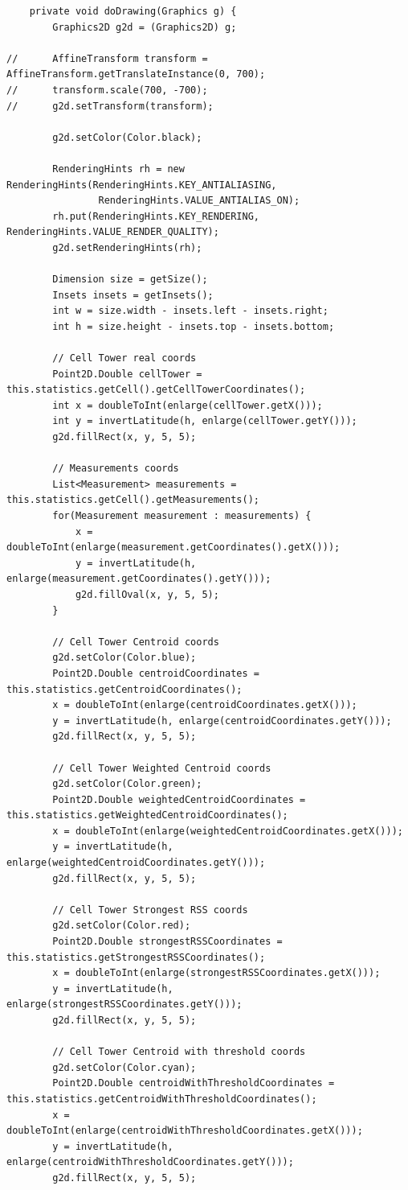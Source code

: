 \documentclass[a4paper, 12pt]{article}
\begin{document}
\begin{lstlisting}
	private void doDrawing(Graphics g) {
		Graphics2D g2d = (Graphics2D) g;
		
//		AffineTransform transform = AffineTransform.getTranslateInstance(0, 700);
//		transform.scale(700, -700);
//		g2d.setTransform(transform);
		
		g2d.setColor(Color.black);
		
		RenderingHints rh = new RenderingHints(RenderingHints.KEY_ANTIALIASING,
				RenderingHints.VALUE_ANTIALIAS_ON);
		rh.put(RenderingHints.KEY_RENDERING, RenderingHints.VALUE_RENDER_QUALITY);
		g2d.setRenderingHints(rh);
		
		Dimension size = getSize();
		Insets insets = getInsets();
		int w = size.width - insets.left - insets.right;
		int h = size.height - insets.top - insets.bottom;
		
		// Cell Tower real coords
		Point2D.Double cellTower = this.statistics.getCell().getCellTowerCoordinates();
		int x = doubleToInt(enlarge(cellTower.getX()));
		int y = invertLatitude(h, enlarge(cellTower.getY()));
		g2d.fillRect(x, y, 5, 5);
		
		// Measurements coords
		List<Measurement> measurements = this.statistics.getCell().getMeasurements();
		for(Measurement measurement : measurements) {
			x = doubleToInt(enlarge(measurement.getCoordinates().getX()));
			y = invertLatitude(h, enlarge(measurement.getCoordinates().getY()));
			g2d.fillOval(x, y, 5, 5);
		}
		
		// Cell Tower Centroid coords
		g2d.setColor(Color.blue);
		Point2D.Double centroidCoordinates = this.statistics.getCentroidCoordinates();
		x = doubleToInt(enlarge(centroidCoordinates.getX()));
		y = invertLatitude(h, enlarge(centroidCoordinates.getY()));
		g2d.fillRect(x, y, 5, 5);
		
		// Cell Tower Weighted Centroid coords
		g2d.setColor(Color.green);
		Point2D.Double weightedCentroidCoordinates = this.statistics.getWeightedCentroidCoordinates();
		x = doubleToInt(enlarge(weightedCentroidCoordinates.getX()));
		y = invertLatitude(h, enlarge(weightedCentroidCoordinates.getY()));
		g2d.fillRect(x, y, 5, 5);
		
		// Cell Tower Strongest RSS coords
		g2d.setColor(Color.red);
		Point2D.Double strongestRSSCoordinates = this.statistics.getStrongestRSSCoordinates();
		x = doubleToInt(enlarge(strongestRSSCoordinates.getX()));
		y = invertLatitude(h, enlarge(strongestRSSCoordinates.getY()));
		g2d.fillRect(x, y, 5, 5);
		
		// Cell Tower Centroid with threshold coords
		g2d.setColor(Color.cyan);
		Point2D.Double centroidWithThresholdCoordinates = this.statistics.getCentroidWithThresholdCoordinates();
		x = doubleToInt(enlarge(centroidWithThresholdCoordinates.getX()));
		y = invertLatitude(h, enlarge(centroidWithThresholdCoordinates.getY()));
		g2d.fillRect(x, y, 5, 5);
		

\end{lstlisting}
\end{document}
